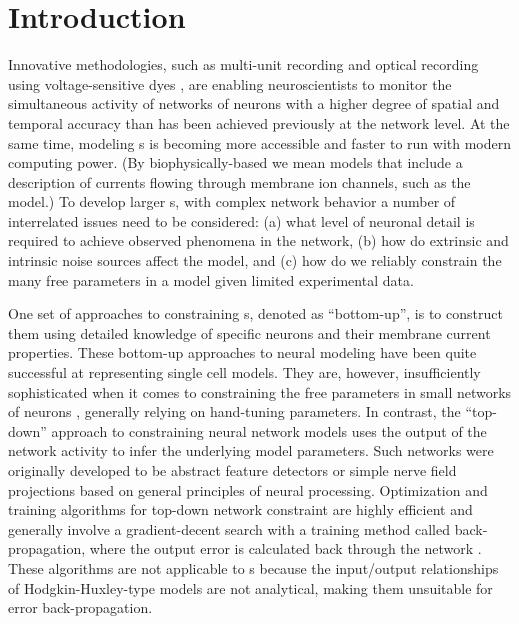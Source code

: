 

\section{Introduction}\label{sec:GA:intro}

Innovative methodologies, such as multi-unit recording
\citep{BrownKassEtAl:2004} and optical recording using
voltage-sensitive dyes
\citep{GrinvaldHildesheim:2004,YangDoiEtAl:2000}, are enabling
neuroscientists to monitor the simultaneous activity of networks of
neurons with a higher degree of spatial and temporal accuracy than has
been achieved previously at the network level. At the same time,
modeling {\BNN}s is becoming more
accessible and faster to run with modern computing power. (By
biophysically-based we mean models that include a description of
currents flowing through membrane ion channels, such as the
{\HH} model.)  To develop larger {\BNN}s, with complex network
behavior a number of interrelated issues need to be considered: (a)
what level of neuronal detail is required to achieve observed
phenomena in the network, (b) how do extrinsic and intrinsic noise
sources affect the model, and (c) how do we reliably constrain the
many free parameters in a model given limited experimental data.

\smallskip{} 

One set of approaches to constraining {\BNN}s, denoted as ``bottom-up'',
is to construct them using detailed knowledge of specific neurons and
their membrane current properties. These bottom-up approaches to
neural modeling have been quite successful at representing single cell
models. They are, however, insufficiently sophisticated when it comes
to constraining the free parameters in small networks of neurons
\citep{GrillnerMarkramEtAl:2005,KochSegev:1998}, generally relying on
hand-tuning parameters. In contrast, the ``top-down'' approach to
constraining neural network models uses the output of the network
activity to infer the underlying model parameters. Such networks were
originally developed to be abstract feature detectors
\citep{Malsberg:1973} or simple nerve field projections
\citep{Amari:1980} based on general principles of neural processing.
Optimization and training algorithms for top-down network constraint
are highly efficient and generally involve a gradient-decent search
with a training method called back-propagation, where the output error
is calculated back through the network
\citep{RumelhartHintonEtAl:1986a}. These algorithms are not applicable
to {\BNN}s because the input/output relationships of Hodgkin-Huxley-type
models are not analytical, making them unsuitable for error
back-propagation.

